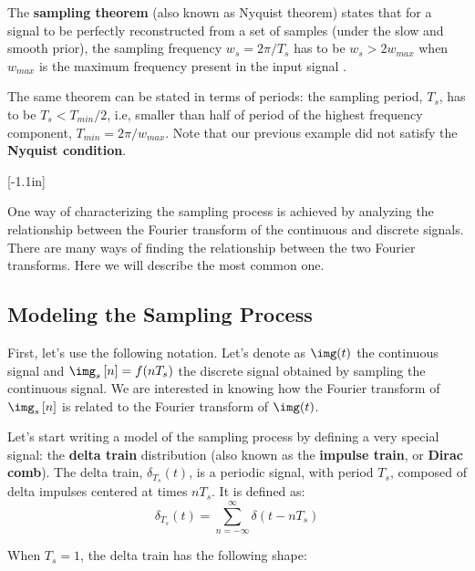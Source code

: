 The {\bf sampling theorem} (also known as Nyquist theorem) 
states that for a signal to be perfectly reconstructed from a set of samples (under the slow and smooth prior), the sampling frequency $w_s = 2 \pi /T_s$ has to be $w_s > 2w_{max}$ when $w_{max}$ is the maximum frequency present in the input signal \cite{Shannon1948}. 


The same theorem can be stated in terms of periods: the sampling period, $T_s$, has to be $T_s < T_{min} / 2$, i.e, smaller than half of period of the highest frequency component, $T_{min} = 2 \pi /w_{max}$. Note that our previous example did not satisfy the {\bf Nyquist condition}.

[-1.1in] 

One way of characterizing the sampling process is achieved by analyzing the relationship between the Fourier transform of the continuous and discrete signals.
There are many ways of finding the relationship between the two Fourier transforms. Here we will describe the most common one. 

\subsection{Modeling the Sampling Process}

First, let's use the following notation. Let's denote as $\img(t)$ the continuous signal and $\img_s \left[ n \right] = f(nT_s)$ the discrete signal obtained by sampling the continuous signal. We are interested in knowing how the Fourier transform of $\img_s \left[ n \right]$ is related to the Fourier transform of $\img(t)$.

Let's start writing a model of the sampling process by defining a very special signal: the {\bf delta train} distribution (also known as the {\bf impulse train}, or {\bf Dirac comb}). 
The delta train, $\delta_{T_s}(t)$, is a periodic signal, with period $T_s$, composed of delta impulses centered at times $nT_s$. It is defined as: 
\begin{equation}
\delta_{T_s}(t) = \sum_{n=-\infty}^{\infty} \delta(t-n T_s)
\end{equation}

When $T_s = 1$, the delta train has the following shape:


